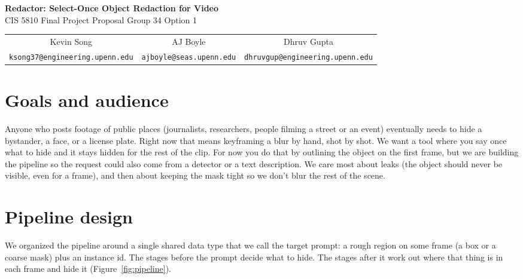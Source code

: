\documentclass[10pt,letterpaper]{article}
\begin{document}
\begin{center}
{\Large\bfseries Redactor: Select-Once Object Redaction for Video}\\[4pt]
CIS 5810 Final Project Proposal \textbullet{} Group 34 \textbullet{} Option 1\\[3pt]
\small
\begin{tabular}{ccc}
Kevin Song & AJ Boyle & Dhruv Gupta \\
\texttt{ksong37@engineering.upenn.edu} & \texttt{ajboyle@seas.upenn.edu} & \texttt{dhruvgup@engineering.upenn.edu}
\end{tabular}
\end{center}

\section{Goals and audience}

Anyone who posts footage of public places (journalists, researchers, people filming a street or an
event) eventually needs to hide a bystander, a face, or a license plate. Right now that means
keyframing a blur by hand, shot by shot. We want a tool where you say once what to hide and it stays
hidden for the rest of the clip. For now you do that by outlining the object on the first frame, but
we are building the pipeline so the request could also come from a detector or a text description.
We care most about leaks (the object should never be visible, even for a frame), and then about
keeping the mask tight so we don't blur the rest of the scene.

\section{Pipeline design}

We organized the pipeline around a single shared data type that we call the target prompt: a rough
region on some frame (a box or a coarse mask) plus an instance id. The stages before the prompt
decide what to hide. The stages after it work out where that thing is in each frame and hide it
(Figure~\ref{fig:pipeline}).
\end{document}
